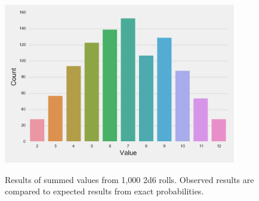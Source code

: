 \documentclass{article}
\begin{document}
\begin{figure}[H]
\begin{floatrow}
\includegraphics[width=4in]{2d6.pdf}
{%
}
\end{floatrow}
\caption{Results of summed values from 1,000 2d6 rolls. Observed results are compared to expected results from exact probabilities.}
\end{figure}

\end{document}

